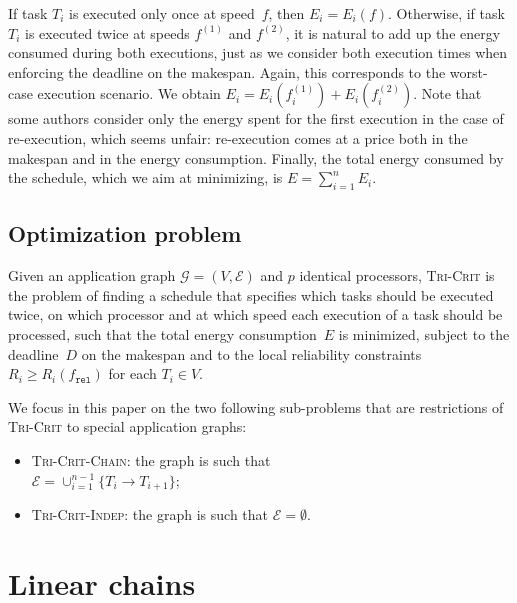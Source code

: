 \documentclass[a4paper]{article}
\theoremstyle{plain}
\theoremstyle{definition}
\theoremstyle{remark}
\newcommand{\fr}{\ensuremath{f_{\texttt{rel}}}\xspace}
\newcommand{\tricrit}{\textsc{Tri-Crit}\xspace}
\newcommand{\chain}{\textsc{Tri-Crit-Chain}\xspace}
\newcommand{\indep}{\textsc{Tri-Crit-In\-dep}\xspace}
\begin{document}
If task $T_{i}$ is executed only once at speed~$f$, then $E_{i} =
E_i(f)$.  Otherwise, if task $T_{i}$ is executed twice at speeds
$f^{(1)}$ and $f^{(2)}$, it is natural to add up the energy consumed
during both executions, just as we consider both execution times when
enforcing the deadline on the makespan. Again, this corresponds to the
worst-case execution scenario.  We obtain $E_i = E_i(f^{(1)}_i) +
E_i(f^{(2)}_i)$.  Note that some authors \cite{Zhu06} consider only
the energy spent for the first execution in the case of re-execution,
which seems unfair: re-execution comes at a price both in the makespan
and in the energy consumption.  Finally, the total energy consumed by
the schedule, which we aim at minimizing, is $E = \sum_{i=1}^{n} E_i$.









    \subsection{Optimization problem}
\label{opt_problem}
Given an application graph $\mathcal{G}=(V,\mathcal{E})$ and $p$
identical processors, \tricrit is the problem of finding a schedule
that specifies which tasks should be executed twice, on which
processor and at which speed each execution of a task should be
processed, such that the total energy consumption~$E$ is minimized,
subject to the deadline~$D$ on the makespan and to the local reliability
constraints $R_i \geq R_i(\fr)$ for each $T_i \in V$.


We focus in this paper on the two following sub-problems that are 
restrictions of \tricrit to special application graphs:
\begin{itemize}
\item \chain: the graph is such that 
\\$\mathcal{E} = \cup_{i=1}^{n-1} \{ T_i \rightarrow T_{i+1}\}$; 

\item \indep: 
  the graph is such that $\mathcal{E}=\emptyset$.
\end{itemize}






\section{Linear chains}
\label{sec.lin}
\end{document}
